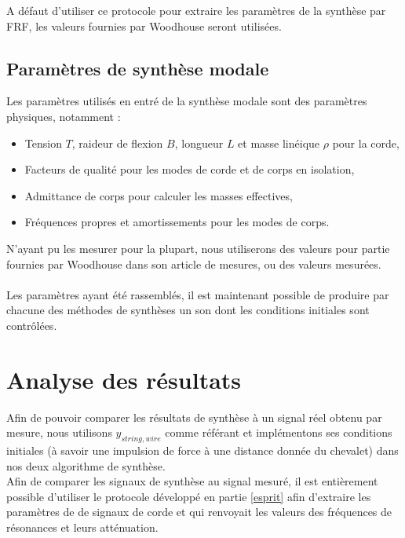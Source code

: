 A défaut d'utiliser ce protocole pour extraire les paramètres de la synthèse par FRF, les valeurs fournies par Woodhouse \cite{woodhouse2004plucked} seront utilisées.

\subsection{Paramètres de synthèse modale}

Les paramètres utilisés en entré de la synthèse modale sont des paramètres physiques, notamment :
\begin{itemize}
 \item Tension \( T \), raideur de flexion \( B \), longueur \( L \) et
  masse linéique \( \rho \) pour la corde,
 \item Facteurs de qualité pour les modes de corde et de corps en isolation,
 \item Admittance de corps pour calculer les masses effectives,
 \item Fréquences propres et amortissements pour les modes de corps.
\end{itemize}
N'ayant pu les mesurer pour la plupart, nous utiliserons des valeurs pour
partie fournies par Woodhouse dans son article de mesures,
ou des valeurs mesurées.
\\\\

Les paramètres ayant été rassemblés, il est maintenant possible de produire par chacune des méthodes de synthèses un son dont les conditions initiales sont contrôlées.

\section{Analyse des résultats}
Afin de pouvoir comparer les résultats de synthèse à un signal réel obtenu par mesure, nous utilisons $y_{string,wire}$ comme référant et implémentons ses conditions initiales (à savoir une impulsion de force à une distance donnée du chevalet) dans nos deux algorithme de synthèse.\\
Afin de comparer les signaux de synthèse au signal mesuré, il est entièrement possible d'utiliser le protocole développé en partie \ref{esprit} afin d'extraire les paramètres de de signaux de corde et qui renvoyait les valeurs des fréquences de résonances et leurs atténuation.\\

